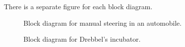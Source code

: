 There is a separate figure for each block diagram.
\begin{figure}
   \begin{center}
      \begin{small}
         
      \end{small}
      \caption{Block diagram for manual steering in an automobile.}
      \label{fig:manual-steering}
   \end{center}
\end{figure}
\begin{figure}
   \begin{center}
      \begin{small}
         
      \end{small}
      \caption{Block diagram for Drebbel's incubator.}
      \label{fig:incubator}
   \end{center}
\end{figure}
